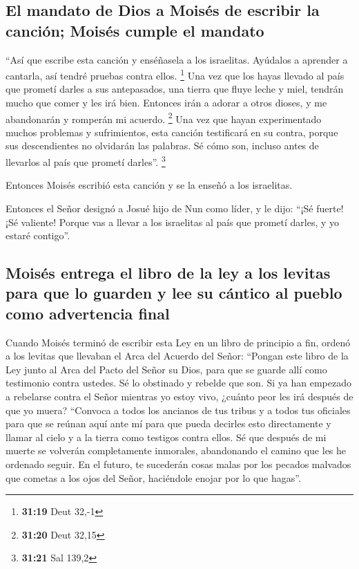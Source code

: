 \hypertarget{el-mandato-de-dios-a-moisuxe9s-de-escribir-la-canciuxf3n-moisuxe9s-cumple-el-mandato}{%
\subsection{El mandato de Dios a Moisés de escribir la canción; Moisés
cumple el
mandato}\label{el-mandato-de-dios-a-moisuxe9s-de-escribir-la-canciuxf3n-moisuxe9s-cumple-el-mandato}}

 ``Así que escribe esta canción y enséñasela a los
israelitas. Ayúdalos a aprender a cantarla, así tendré pruebas contra
ellos. \footnote{\textbf{31:19} Deut 32,-1}  Una vez que
los hayas llevado al país que prometí darles a sus antepasados, una
tierra que fluye leche y miel, tendrán mucho que comer y les irá bien.
Entonces irán a adorar a otros dioses, y me abandonarán y romperán mi
acuerdo. \footnote{\textbf{31:20} Deut 32,15}  Una vez
que hayan experimentado muchos problemas y sufrimientos, esta canción
testificará en su contra, porque sus descendientes no olvidarán las
palabras. Sé cómo son, incluso antes de llevarlos al país que prometí
darles''. \footnote{\textbf{31:21} Sal 139,2}

 Entonces Moisés escribió esta canción y se la enseñó a
los israelitas.

 Entonces el Señor designó a Josué hijo de Nun como
líder, y le dijo: ``¡Sé fuerte! ¡Sé valiente! Porque vas a llevar a los
israelitas al país que prometí darles, y yo estaré contigo''.

\hypertarget{moisuxe9s-entrega-el-libro-de-la-ley-a-los-levitas-para-que-lo-guarden-y-lee-su-cuxe1ntico-al-pueblo-como-advertencia-final}{%
\subsection{Moisés entrega el libro de la ley a los levitas para que lo
guarden y lee su cántico al pueblo como advertencia
final}\label{moisuxe9s-entrega-el-libro-de-la-ley-a-los-levitas-para-que-lo-guarden-y-lee-su-cuxe1ntico-al-pueblo-como-advertencia-final}}

 Cuando Moisés terminó de escribir esta Ley en un libro
de principio a fin,  ordenó a los levitas que llevaban el
Arca del Acuerdo del Señor:  ``Pongan este libro de la
Ley junto al Arca del Pacto del Señor su Dios, para que se guarde allí
como testimonio contra ustedes.  Sé lo obstinado y
rebelde que son. Si ya han empezado a rebelarse contra el Señor mientras
yo estoy vivo, ¿cuánto peor les irá después de que yo muera?
 ``Convoca a todos los ancianos de tus tribus y a todos
tus oficiales para que se reúnan aquí ante mí para que pueda decirles
esto directamente y llamar al cielo y a la tierra como testigos contra
ellos.  Sé que después de mi muerte se volverán
completamente inmorales, abandonando el camino que les he ordenado
seguir. En el futuro, te sucederán cosas malas por los pecados malvados
que cometas a los ojos del Señor, haciéndole enojar por lo que hagas''.

